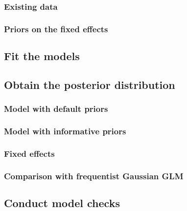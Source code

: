\documentclass[
]{book}
\begin{document}
\hypertarget{existing-data}{%
\subsubsection{Existing data}\label{existing-data}}

\hypertarget{pois-priors-fixed}{%
\subsubsection{Priors on the fixed effects}\label{pois-priors-fixed}}

\hypertarget{pois-fit-models}{%
\subsection{Fit the models}\label{pois-fit-models}}

\hypertarget{obtain-the-posterior-distribution-1}{%
\subsection{Obtain the posterior
distribution}\label{obtain-the-posterior-distribution-1}}

\hypertarget{pois-def-priors}{%
\subsubsection{Model with default priors}\label{pois-def-priors}}

\hypertarget{pois-inf-priors}{%
\subsubsection{Model with informative priors}\label{pois-inf-priors}}

\hypertarget{fixed-effects-2}{%
\subsubsection{Fixed effects}\label{fixed-effects-2}}

\hypertarget{pois-freq-comp}{%
\subsubsection{Comparison with frequentist Gaussian
GLM}\label{pois-freq-comp}}

\hypertarget{conduct-model-checks-1}{%
\subsection{Conduct model checks}\label{conduct-model-checks-1}}
\end{document}
